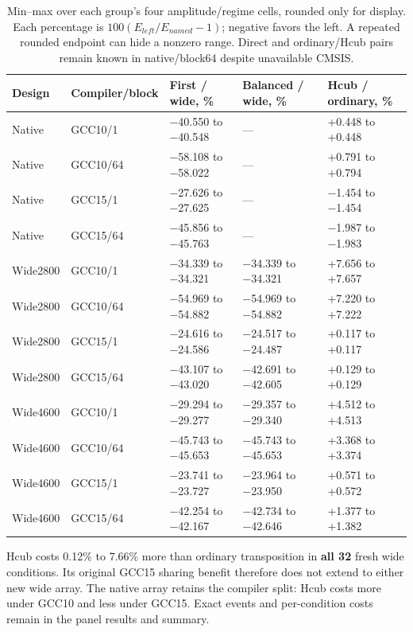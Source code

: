 \documentclass[conference]{IEEEtran}
\begin{document}
\begin{table}[t]
\centering\footnotesize
\caption{Min--max over each group's four amplitude/regime cells, rounded only for
display. Each percentage is \(100(E_{left}/E_{named}-1)\); negative
favors the left. A repeated rounded endpoint can hide a nonzero range.
Direct and ordinary/Hcub pairs remain known in native/block64 despite
unavailable CMSIS.}\label{tab:11}
\begin{tabularx}{\textwidth}{@{}>{\raggedright\arraybackslash}X>{\raggedright\arraybackslash}X>{\raggedright\arraybackslash}X>{\raggedright\arraybackslash}X>{\raggedright\arraybackslash}X@{}}
\toprule
Design & Compiler/block & First / wide, \% & Balanced / wide, \% & Hcub / ordinary, \% \\
\midrule
Native & GCC10/1 & −40.550 to −40.548 & --- & +0.448 to +0.448 \\
Native & GCC10/64 & −58.108 to −58.022 & --- & +0.791 to +0.794 \\
Native & GCC15/1 & −27.626 to −27.625 & --- & −1.454 to −1.454 \\
Native & GCC15/64 & −45.856 to −45.763 & --- & −1.987 to −1.983 \\
Wide2800 & GCC10/1 & −34.339 to −34.321 & −34.339 to −34.321 & +7.656 to +7.657 \\
Wide2800 & GCC10/64 & −54.969 to −54.882 & −54.969 to −54.882 & +7.220 to +7.222 \\
Wide2800 & GCC15/1 & −24.616 to −24.586 & −24.517 to −24.487 & +0.117 to +0.117 \\
Wide2800 & GCC15/64 & −43.107 to −43.020 & −42.691 to −42.605 & +0.129 to +0.129 \\
Wide4600 & GCC10/1 & −29.294 to −29.277 & −29.357 to −29.340 & +4.512 to +4.513 \\
Wide4600 & GCC10/64 & −45.743 to −45.653 & −45.743 to −45.653 & +3.368 to +3.374 \\
Wide4600 & GCC15/1 & −23.741 to −23.727 & −23.964 to −23.950 & +0.571 to +0.572 \\
Wide4600 & GCC15/64 & −42.254 to −42.167 & −42.734 to −42.646 & +1.377 to +1.382 \\
\bottomrule
\end{tabularx}
\end{table}

Hcub costs 0.12\% to 7.66\% more than ordinary transposition in
\textbf{all 32} fresh wide conditions. Its original GCC15 sharing
benefit therefore does not extend to either new wide array. The native
array retains the compiler split: Hcub costs more under GCC10 and less
under GCC15. Exact events and per-condition costs remain in the panel
results and summary.
\end{document}
